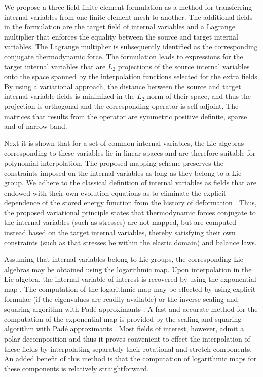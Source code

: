 \documentclass[12pt]{article}
\begin{document}
We propose a three-field finite element formulation as a method for transferring
internal variables from one finite element mesh to another. The additional
fields in the formulation are the target field of internal variables and a
Lagrange multiplier that enforces the equality between the source and target
internal variables. The Lagrange multiplier is subsequently identified as the
corresponding conjugate thermodynamic force. The formulation leads to
expressions for the target internal variables that are $L_2$ projections of the
source internal variables onto the space spanned by the interpolation functions
selected for the extra fields. By using a variational approach, the distance
between the source and target internal variable fields is minimized in the $L_2$
norm of their space, and thus the projection is orthogonal and the corresponding
operator is self-adjoint. The matrices that results from the operator are
symmetric positive definite, sparse and of narrow band.

Next it is shown that for a set of common internal variables, the Lie algebras
corresponding to these variables lie in linear spaces and are therefore suitable
for polynomial interpolation.  The proposed mapping scheme preserves the
constraints imposed on the internal variables as long as they belong to a Lie
group. We adhere to the classical definition of internal variables as fields
that are endowed with their own evolution equations as to eliminate the explicit
dependence of the stored energy function from the history of deformation
\citep{Muschik:2001, Antman:2005}. Thus, the proposed variational principle
states that thermodynamic forces conjugate to the internal variables (such as
stresses) are not mapped, but are computed instead based on the target internal
variables, thereby satisfying their own constraints (such as that stresses be
within the elastic domain) and balance laws.

Assuming that internal variables belong to Lie groups, the corresponding Lie
algebras may be obtained using the logarithmic map. Upon interpolation in the
Lie algebra, the internal variable of interest is recovered by using the
exponential map \citep{Marsden.Ratiu:1999, Sepanski:2007,
Kosmann-Schwarzbach:2009,
  Gallier:2011}. The computation of the logarithmic map may be
effected by using explicit formulae (if the eigenvalues are readily available)
\citep{Jog:2008} or the inverse scaling and squaring algorithm with Pad\'e
approximants \citep{Cheng.etal:2001,
  Davies.Higham:2003}.  A fast and accurate method for the computation
of the exponential map is provided by the scaling and squaring algorithm with
Pad\'e approximants \citep{Higham:2001,Higham:2005}. Most fields of interest,
however, admit a polar decomposition and thus it proves convenient to effect the
interpolation of these fields by interpolating separately their rotational and
stretch components. An added benefit of this method is that the computation of
logarithmic maps for these components is relatively straightforward.
\end{document}
